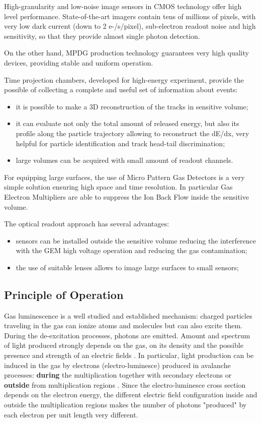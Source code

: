 \documentclass[physics,article,submit,moreauthors,pdftex]{Definitions/mdpi}
\begin{document}
High-granularity and low-noise image sensors in CMOS technology offer high level performance. State-of-the-art imagers contain tens of millions of pixels, with very low dark current (down to 2 e-/s/pixel), sub-electron readout noise and high sensitivity, so that they provide almost single photon detection. 

On the other hand, MPDG production technology guarantees very high quality devices, providing stable and uniform operation.

Time projection chambers, developed for high-energy experiment, provide the possible of collecting a complete and useful set of information about events:
\begin{itemize}
    \item it is possible to make a 3D reconstruction of the tracks in sensitive volume;
    \item it can evaluate not only the total amount of released energy, but also its profile along the particle trajectory allowing to reconstruct the dE/dx, very helpful for particle identification and track head-tail discrimination;
    \item large volumes can be acquired with small amount of readout channels. 
\end{itemize}

For equipping large surfaces, the use of Micro Pattern Gas Detectors
is a very simple solution ensuring high space and time resolution.
In particular Gas Electron Multipliers are able to suppress
the Ion Back Flow inside the sensitive volume. 

The optical readout approach has several advantages:
\begin{itemize}
\item sensors can be installed  outside the 
sensitive volume reducing the interference with  the GEM high voltage operation and reducing  the gas contamination;
\item the use of suitable lenses allows to 
image   large surfaces to small sensors;
\end{itemize}



\subsection{Principle of Operation}
Gas luminescence is a well studied and established mechanism: charged particles traveling in the gas can ionize atoms and molecules but can also excite them. During the de-excitation processes, photons are emitted. Amount and spectrum of light produced strongly depends on the gas, on its density and the possible presence and strength of an electric fields \cite{bib:Fraga}.
In particular, light production can be induced in the gas by electrons (electro-luminesce) produced in avalanche processes: {\bf during} the  multiplication together with secondary electrons or {\bf outside} from multiplication regions \cite{bib:lumi}. 
Since the electro-luminesce cross section depends on the electron energy, the different electric field configuration inside and outside the multiplication regions makes the number of photons "produced" by each electron per unit length very different.
\end{document}
